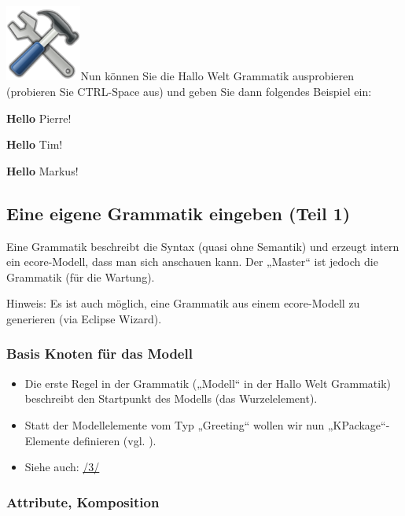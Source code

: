 \documentclass[]{article}
\providecommand{\tightlist}{%
  \setlength{\itemsep}{0pt}\setlength{\parskip}{0pt}}
\begin{document}
\includegraphics[width=0.98350in,height=0.98350in]{./Pictures/1000020100000080000000807EA91CDFA7B7F397.png}Nun
können Sie die Hallo Welt Grammatik ausprobieren\\
(probieren Sie CTRL-Space aus) und geben Sie dann folgendes Beispiel
ein:

\textbf{Hello} Pierre!

\textbf{Hello} Tim!

\textbf{Hello} Markus!

\subsection[Eine eigene Grammatik eingeben (Teil
1)]{\texorpdfstring{\protect\hypertarget{anchor-20}{}{}Eine eigene
Grammatik eingeben (Teil
1)}{Eine eigene Grammatik eingeben (Teil 1)}}\label{eine-eigene-grammatik-eingeben-teil-1}

Eine Grammatik beschreibt die Syntax (quasi ohne Semantik) und erzeugt
intern ein ecore-Modell, dass man sich anschauen kann. Der „Master`` ist
jedoch die Grammatik (für die Wartung).

Hinweis: Es ist auch möglich, eine Grammatik aus einem ecore-Modell zu
generieren (via Eclipse Wizard).

\subsubsection[Basis Knoten für das
Modell]{\texorpdfstring{\protect\hypertarget{anchor-21}{}{}Basis Knoten
für das
Modell}{Basis Knoten für das Modell}}\label{basis-knoten-fuxfcr-das-modell}

\begin{itemize}
\tightlist
\item
  Die erste Regel in der Grammatik („Modell`` in der Hallo Welt
  Grammatik) beschreibt den Startpunkt des Modells (das Wurzelelement).
\item
  Statt der Modellelemente vom Typ „Greeting`` wollen wir nun
  „KPackage``-Elemente definieren (vgl. ).
\item
  Siehe auch: \protect\hyperlink{anchor-3}{/3/}
\end{itemize}

\subsubsection[Attribute,
Komposition]{\texorpdfstring{\protect\hypertarget{anchor-22}{}{}Attribute,
Komposition}{Attribute, Komposition}}\label{attribute-komposition}
\end{document}
